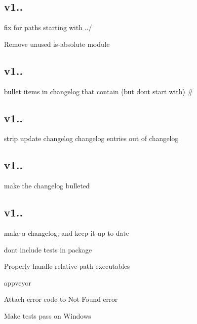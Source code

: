 \subsection*{v1..}


\begin{DoxyItemize}
\item fix for paths starting with ../
\item Remove unused {\ttfamily is-\/absolute} module
\end{DoxyItemize}

\subsection*{v1..}


\begin{DoxyItemize}
\item bullet items in changelog that contain (but don\textquotesingle{}t start with) \#
\end{DoxyItemize}

\subsection*{v1..}


\begin{DoxyItemize}
\item strip \textquotesingle{}update changelog\textquotesingle{} changelog entries out of changelog
\end{DoxyItemize}

\subsection*{v1..}


\begin{DoxyItemize}
\item make the changelog bulleted
\end{DoxyItemize}

\subsection*{v1..}


\begin{DoxyItemize}
\item make a changelog, and keep it up to date
\item don\textquotesingle{}t include tests in package
\item Properly handle relative-\/path executables
\item appveyor
\item Attach error code to Not Found error
\item Make tests pass on Windows
\end{DoxyItemize}

